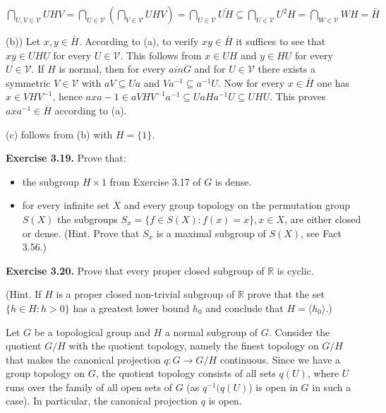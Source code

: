 \documentclass[12pt]{article}
\begin{document}
        $\bigcap_{U,V \in \mathcal{V}} UHV = \bigcap_{U \in \mathcal{V}}(\bigcap_{V \in \mathcal{V}} UHV) = \bigcap_{U \in \mathcal{V}} \bar{UH} \subseteq \bigcap_{U \in \mathcal{V}} U^2 H = \bigcap_{W \in \mathcal{V}} WH = \bar{H}$


        (b)) Let $x, y \in \bar{H}$. According to (a), to verify $xy \in \bar{H}$ it suffices to see that $xy \in UHU$ for every $U \in \mathcal{V}$. This
        follows from $x \in UH$ and $y \in HU$ for every $U \in \mathcal{V}$. If $H$ is normal, then for every $a in G$ and for $U \in \mathcal{V}$ there
        exists a symmetric $V \in \mathcal{V}$ with $aV \subseteq U a$ and $V a^{-1} \subseteq a^{-1}U$. Now for every $x \in \bar{H}$ one has $x \in V HV^{-1}$, hence
        $axa-1 \in aV HV^{-1} a^{-1} \subseteq U aHa^{-1} U \subseteq UHU$. This proves $axa^{-1} \in \bar{H}$ according to (a).


        (c) follows from (b) with $H = \{1\}$.


    \textbf{Exercise 3.19.} Prove that: 

        
        \begin{itemize}

                \item the subgroup $H \times {1}$ from Exercise 3.17 of $G$ is dense.
                
                \item for every infinite set $X$ and every group topology on the permutation group $S(X)$ the subgroups $S_x = \{f \in S(X) : f(x) = x\}, x \in X$,
                are either closed or dense. (Hint. Prove that $S_x$ is a maximal subgroup of
                $S(X)$, see Fact 3.56.)
        
            \end{itemize}

    
    \textbf{Exercise 3.20.} Prove that every proper closed subgroup of $\mathbb{R}$ is cyclic.

    
    (Hint. If $H$ is a proper closed non-trivial subgroup of $\mathbb{R}$ prove that the set $\{h \in H : h > 0\}$ has a greatest
lower bound $h_0$ and conclude that $H = \langle h_0 \rangle $.)


    Let $G$ be a topological group and $H$ a normal subgroup of $G$. Consider the quotient $G/H$ with the quotient
topology, namely the finest topology on $G/H$ that makes the canonical projection $q : G \to G/H$ continuous.
Since we have a group topology on $G$, the quotient topology consists of all sets $q(U)$, where $U$ runs over the
family of all open sets of $G$ (as $q^{-1}(q(U)$) is open in $G$ in such a case). In particular, the canonical projection
$q$ is open.
\end{document}
